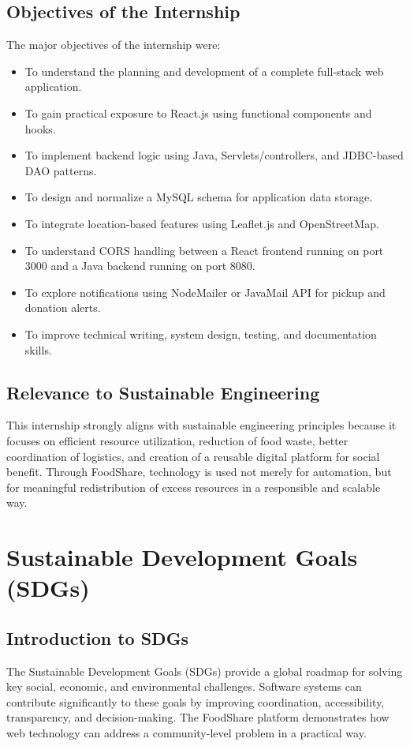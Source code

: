 \documentclass[12pt,a4paper]{report}
\newcommand{\projecttitle}{FoodShare}
\begin{document}
\section{Objectives of the Internship}
The major objectives of the internship were:
\begin{itemize}[leftmargin=1.2cm]
\item To understand the planning and development of a complete full-stack web application.
\item To gain practical exposure to React.js using functional components and hooks.
\item To implement backend logic using Java, Servlets/controllers, and JDBC-based DAO patterns.
\item To design and normalize a MySQL schema for application data storage.
\item To integrate location-based features using Leaflet.js and OpenStreetMap.
\item To understand CORS handling between a React frontend running on port 3000 and a Java backend running on port 8080.
\item To explore notifications using NodeMailer or JavaMail API for pickup and donation alerts.
\item To improve technical writing, system design, testing, and documentation skills.
\end{itemize}

\section{Relevance to Sustainable Engineering}
This internship strongly aligns with sustainable engineering principles because it focuses on efficient resource utilization, reduction of food waste, better coordination of logistics, and creation of a reusable digital platform for social benefit. Through \projecttitle, technology is used not merely for automation, but for meaningful redistribution of excess resources in a responsible and scalable way.

\chapter{Sustainable Development Goals (SDGs)}

\section{Introduction to SDGs}
The Sustainable Development Goals (SDGs) provide a global roadmap for solving key social, economic, and environmental challenges. Software systems can contribute significantly to these goals by improving coordination, accessibility, transparency, and decision-making. The \projecttitle{} platform demonstrates how web technology can address a community-level problem in a practical way.
\end{document}
